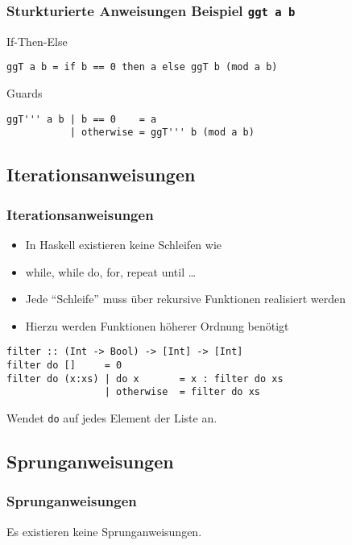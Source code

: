 \begin{frame}[fragile]
\frametitle{Sturkturierte Anweisungen Beispiel \lstinline|ggt a b|}
\begin{block}{If-Then-Else}
\begin{lstlisting}
ggT a b = if b == 0 then a else ggT b (mod a b)
\end{lstlisting}
\end{block}
\begin{block}{Guards}
\begin{lstlisting}
ggT''' a b | b == 0    = a
           | otherwise = ggT''' b (mod a b) 
\end{lstlisting}
\end{block}
\end{frame}

\subsection{Iterationsanweisungen}
\begin{frame}[fragile]
\frametitle{Iterationsanweisungen}
\begin{block}{\vspace*{-3ex}}
\begin{itemize}
  \item In Haskell existieren keine Schleifen wie
  \item while, while do, for, repeat until \ldots
  \item Jede "`Schleife"' muss über rekursive Funktionen realisiert werden
  \item Hierzu werden Funktionen höherer Ordnung benötigt
\end{itemize}
\end{block}
\begin{lstlisting}
filter :: (Int -> Bool) -> [Int] -> [Int]
filter do []     = 0
filter do (x:xs) | do x       = x : filter do xs
                 | otherwise  = filter do xs
\end{lstlisting}
\vspace*{-3ex}
\begin{block}{\vspace*{-3ex}}
Wendet \lstinline|do| auf jedes Element der Liste an.
\end{block}
\end{frame}

\subsection{Sprunganweisungen}
\begin{frame}
\frametitle{Sprunganweisungen}
\begin{block}{\vspace*{-3ex}}
Es existieren keine Sprunganweisungen.
\end{block}
\end{frame}
